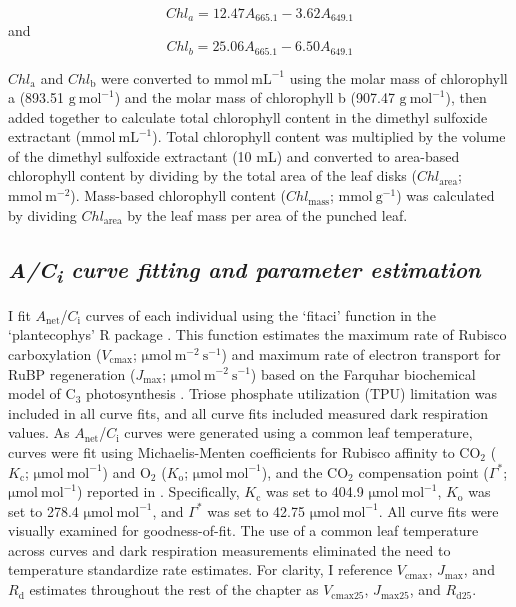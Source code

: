 \begin{equation} \label{eq_5.1}
    Chl_{a}=12.47A_{665.1}-3.62A_{649.1}
\end{equation}
\noindent and
\begin{equation} \label{eq_5.2}
    Chl_{b}=25.06A_{665.1}-6.50A_{649.1}
\end{equation}
    
\noindent $Chl_\mathrm{a}$ and $Chl_\mathrm{b}$ were converted to $\mathrm{mmol\ mL^{-1}}$ using the molar mass of chlorophyll a (893.51 $\mathrm{g\ mol^{-1}}$) and the molar mass of chlorophyll b (907.47 $\mathrm{g\ mol^{-1}}$), then added together to calculate total chlorophyll content in the dimethyl sulfoxide extractant ($\mathrm{mmol\ mL^{-1}}$). Total chlorophyll content was multiplied by the volume of the dimethyl sulfoxide extractant (10 mL) and converted to area-based chlorophyll content by dividing by the total area of the leaf disks ($Chl_\mathrm{area}$; $\mathrm{mmol\ m^{-2}}$). Mass-based chlorophyll content ($Chl_\mathrm{mass}$; $\mathrm{mmol\ g^{-1}}$) was calculated by dividing $Chl_\mathrm{area}$ by the leaf mass per area of the punched leaf.

\subsection{\textit{A/C\textsubscript{i} curve fitting and parameter estimation}}
\noindent I fit $A_\mathrm{net}$/$C_\mathrm{i}$ curves of each individual using the `fitaci’ function in the `plantecophys’ R package . This function estimates the maximum rate of Rubisco carboxylation ($V_\mathrm{cmax}$; $\mathrm{\mu mol\ m^{-2}\ s^{-1}}$) and maximum rate of electron transport for RuBP regeneration ($J_\mathrm{max}$; $\mathrm{\mu mol\ m^{-2}\ s^{-1}}$) based on the Farquhar biochemical model of C$_{3}$ photosynthesis . Triose phosphate utilization (TPU) limitation was included in all curve fits, and all curve fits included measured dark respiration values. As $A_\mathrm{net}$/$C_\mathrm{i}$ curves were generated using a common leaf temperature, curves were fit using Michaelis-Menten coefficients for Rubisco affinity to CO$_2$ ($K_\mathrm{c}$; $\mathrm{\mu mol\ mol^{-1}}$) and $\mathrm{O_2}$ ($K_\mathrm{o}$; $\mathrm{\mu mol\ mol^{-1}}$), and the CO$_2$ compensation point ($\Gamma^*$; $\mathrm{\mu mol\ mol^{-1}}$) reported in . Specifically, $K_\mathrm{c}$ was set to 404.9 $\mathrm{\mu mol\ mol^{-1}}$, $K_\mathrm{o}$ was set to 278.4 $\mathrm{\mu mol\ mol^{-1}}$, and $\Gamma^*$ was set to 42.75 $\mathrm{\mu mol\ mol^{-1}}$. All curve fits were visually examined for goodness-of-fit. The use of a common leaf temperature across curves and dark respiration measurements eliminated the need to temperature standardize rate estimates. For clarity, I reference $V_\mathrm{cmax}$, $J_\mathrm{max}$, and $R_\mathrm{d}$ estimates throughout the rest of the chapter as $V_\mathrm{cmax25}$, $J_\mathrm{max25}$, and $R_\mathrm{d25}$.

